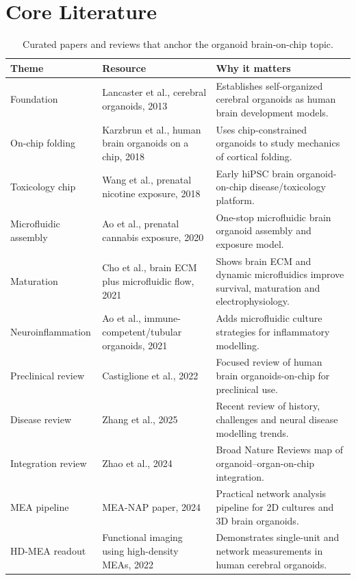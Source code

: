 \documentclass[10pt,twocolumn]{article}
\begin{document}
\section{Core Literature}

\begin{table}[t]
\small
\caption{Curated papers and reviews that anchor the organoid brain-on-chip topic.}
\begin{tabularx}{\textwidth}{p{}p{}X}
\toprule
\textbf{Theme} & \textbf{Resource} & \textbf{Why it matters} \\
\midrule
Foundation & Lancaster et al., cerebral organoids, 2013 \cite{lancaster2013} & Establishes self-organized cerebral organoids as human brain development models. \\
On-chip folding & Karzbrun et al., human brain organoids on a chip, 2018 \cite{karzbrun2018} & Uses chip-constrained organoids to study mechanics of cortical folding. \\
Toxicology chip & Wang et al., prenatal nicotine exposure, 2018 \cite{wang2018} & Early hiPSC brain organoid-on-chip disease/toxicology platform. \\
Microfluidic assembly & Ao et al., prenatal cannabis exposure, 2020 \cite{ao2020} & One-stop microfluidic brain organoid assembly and exposure model. \\
Maturation & Cho et al., brain ECM plus microfluidic flow, 2021 \cite{cho2021} & Shows brain ECM and dynamic microfluidics improve survival, maturation and electrophysiology. \\
Neuroinflammation & Ao et al., immune-competent/tubular organoids, 2021 \cite{ao2021} & Adds microfluidic culture strategies for inflammatory modelling. \\
Preclinical review & Castiglione et al., 2022 \cite{castiglione2022} & Focused review of human brain organoids-on-chip for preclinical use. \\
Disease review & Zhang et al., 2025 \cite{zhang2025} & Recent review of history, challenges and neural disease modelling trends. \\
Integration review & Zhao et al., 2024 \cite{zhao2024} & Broad Nature Reviews map of organoid--organ-on-chip integration. \\
\midrule
MEA pipeline & MEA-NAP paper, 2024 \cite{meanap2024} & Practical network analysis pipeline for 2D cultures and 3D brain organoids. \\
HD-MEA readout & Functional imaging using high-density MEAs, 2022 \cite{hdmea2022} & Demonstrates single-unit and network measurements in human cerebral organoids. \\

\end{tabularx}
\end{table}
\end{document}
